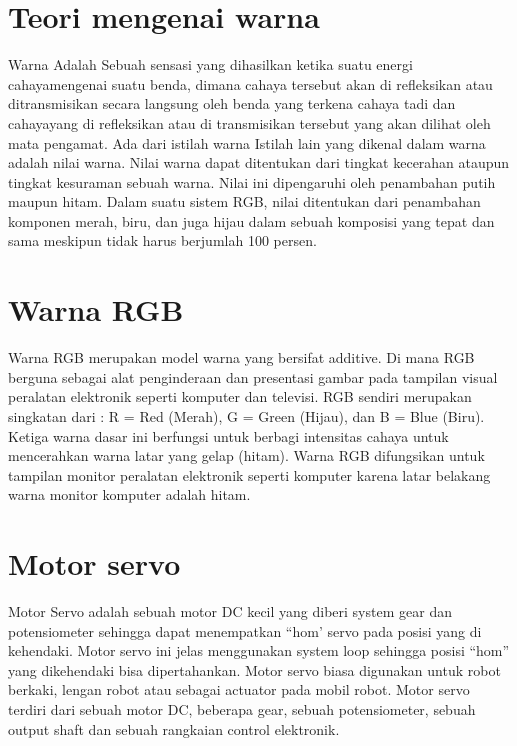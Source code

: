 \section{Teori mengenai warna}
Warna Adalah Sebuah sensasi yang dihasilkan ketika suatu energi cahayamengenai suatu benda, dimana cahaya tersebut akan di refleksikan atau ditransmisikan secara langsung oleh benda yang terkena cahaya tadi dan cahayayang di refleksikan atau di transmisikan tersebut yang akan dilihat oleh mata pengamat. Ada dari istilah warna Istilah lain yang dikenal dalam warna adalah nilai warna. Nilai warna dapat ditentukan dari tingkat kecerahan ataupun tingkat kesuraman sebuah warna. Nilai ini dipengaruhi oleh penambahan putih maupun hitam. Dalam suatu sistem RGB, nilai ditentukan dari penambahan komponen merah, biru, dan juga hijau dalam sebuah komposisi yang tepat dan sama meskipun tidak harus berjumlah 100 persen.

\section{Warna RGB}
Warna RGB merupakan  model warna yang bersifat additive. Di mana RGB berguna sebagai  alat penginderaan dan presentasi gambar pada tampilan visual peralatan elektronik seperti komputer dan televisi. RGB sendiri merupakan singkatan dari : R = Red (Merah), G = Green (Hijau), dan B = Blue (Biru). Ketiga warna dasar ini berfungsi untuk berbagi intensitas cahaya untuk mencerahkan warna latar yang gelap (hitam).  Warna RGB difungsikan untuk tampilan monitor peralatan elektronik seperti komputer karena latar belakang warna monitor komputer adalah hitam.

\section{Motor servo}
Motor Servo adalah sebuah motor DC kecil yang diberi system gear dan potensiometer sehingga dapat menempatkan “hom’ servo pada posisi yang di kehendaki. Motor servo ini jelas menggunakan system loop sehingga posisi “hom” yang dikehendaki bisa dipertahankan. Motor servo biasa digunakan untuk robot berkaki, lengan robot atau sebagai actuator pada mobil robot. Motor servo terdiri dari sebuah motor DC, beberapa gear, sebuah potensiometer, sebuah output shaft dan sebuah rangkaian control elektronik.
